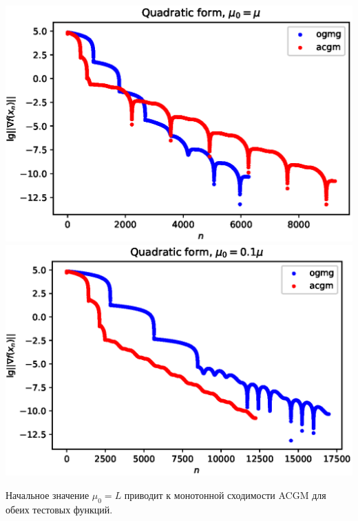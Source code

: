 \documentclass{crm-article}
\begin{document}
\noindent
\includegraphics[scale=0.5]{plots/ogmg_acgm2.eps}
\includegraphics[scale=0.5]{plots/ogmg_acgm1.eps}

Начальное значение $\mu_0=L$ приводит к монотонной сходимости ACGM для обеих тестовых функций. 
\end{document}
